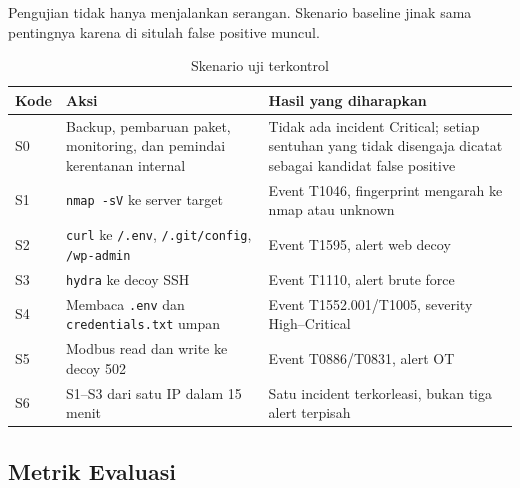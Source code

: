 \documentclass[12pt,a4paper]{article}
\begin{document}
Pengujian tidak hanya menjalankan serangan. Skenario baseline jinak sama pentingnya karena di situlah false positive muncul.

\begin{table}[htbp]
\centering
\caption{Skenario uji terkontrol}
\label{tab:skenario}
\footnotesize
\begin{tabularx}{\textwidth}{@{}l X X@{}}
\toprule
\textbf{Kode} & \textbf{Aksi} & \textbf{Hasil yang diharapkan} \\
\midrule
S0 & Backup, pembaruan paket, monitoring, dan pemindai kerentanan internal & Tidak ada incident Critical; setiap sentuhan yang tidak disengaja dicatat sebagai kandidat false positive \\
S1 & \texttt{nmap -sV} ke server target & Event T1046, fingerprint mengarah ke nmap atau unknown \\
S2 & \texttt{curl} ke \texttt{/.env}, \texttt{/.git/config}, \texttt{/wp-admin} & Event T1595, alert web decoy \\
S3 & \texttt{hydra} ke decoy SSH & Event T1110, alert brute force \\
S4 & Membaca \texttt{.env} dan \texttt{credentials.txt} umpan & Event T1552.001/T1005, severity High--Critical \\
S5 & Modbus read dan write ke decoy 502 & Event T0886/T0831, alert OT \\
S6 & S1--S3 dari satu IP dalam 15 menit & Satu incident terkorleasi, bukan tiga alert terpisah \\
\bottomrule
\end{tabularx}
\end{table}

\subsection{Metrik Evaluasi}
\end{document}
